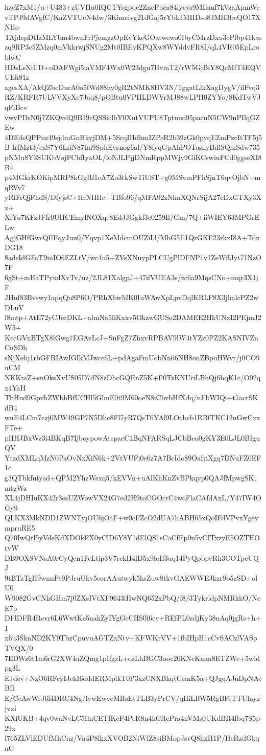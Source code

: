 hzeZ7xM1/u+U483+zUVHu0IQCTYsgpqe2ZncPuca84lycvs9MIlanf7kVzaApmWe
vTPJ9dAVgfC/KaZVTUcN4dw/3Kimcivg21dGaj5rYbkJMHDso8JMH3beQO17XNHo
TAjdcpDtIzMLYbm4bwnFrPjemgzOpEvYkeGOatwewo0IbyCMrzDxu3cPfbp41kas
zq9RP3c5ZMzq0mVkkrwjSNUg2Mt0IBEvKPQXw8WYddvFR8I/qL4VR05EpLroblwC
HDsLsNiUD+oDAFWgi5iaVMF4Wx0W23dgu7HvmT2/rW5GjBiY8QcMfT4EQVUEh81z
agesXA/AkQZbeDurA0o5fWd88hy0gR2tNMK8HV3N/TggatLlkXaglJygV/ilFvq3
RZ/KRFR7ULVVXyXe7Jaq8/pOBtu0VPIILDWVrMJ88wLPH0ZYYo/8KdTwVJqFfBev
vwvPDsN0j7ZKQvdQ9B19cQSSiclbY0XutVUPU8Tptuuo95pacnN5CW9uPIlqGZEw
4DEdeQPPnz49sjdmGnHkyjDM+5ScqIHdhmIZPeR2b39zGk0pyqEZmPzcItTF5j5B
IrfMzt3/eaS7Y6LriN87lm9SphEysnog6al/Y8fyqGpAhPOTosnyBdlSQmSdw735
pNMu8Y3SUKbVojFCbfIyxOL/loNJLPjjDNmRppMWjy9GiKCswiuFCd0ggseXI8B4
p4MGkrKOKipMRP8kGgRf1cA7Zu3tkSwTiUST+g0MSvmPFhSjnT6qvOjbN+mqRVv7
yRfFrQjFhdS/DfyjsC+HrNHHc+TBfo96/qMFA92zNhnXQNrSijA27cDxGTXy3Xx+
XfYu7KFzJFfr0UHCEmylNOXqe8EdJJGgkf3c0259Il/Gm/7Q+iiWIEY63MPGrELw
AgjGHfGwcQEFqyJuu0/Yqvp1XeMdcmOUZiLl/MbG5E1QzGKF23rkxI8A+TdzDG18
8adsIdGFaT9mIO6EZLtV/wc4u5+ZVsXNuypPLCUgPlDFNP1v1ZeWffJyt71NzO7F
6gSt+mHaTPyxdXvTv/uz/2JL81XalgpJ+47ifVUEA3s/zc6a9MqsCNo+mqr3X1jF
JHnf83Bvswy1apqQu8P6O/PRhXbwMK0IuWAwXpLpvDqlKRLF8X3jhalcPZ2wDLuV
l8mtp+AtE72yCJerDKL+almNa5liKxxv5OkzwGUSo2DAMEE2HkUNxI2PEjmJ2W5+
KccGVnBTgX8lGwg7EGAvLcJ+SuFgZ7ZhxvRPBAV9lW4tYZz0PZ2KASNIVZnCnSDh
sNjXebj1rbGFRIAwIGIkMJwce6L+pdAgaFmUobNn66NH8onZBpuHWvr/j0CO9uCM
NKKmZ+snOksXvUS05D7dN8zDhcGQEnZ5K+F0TzKNUriLBhQj6bqK1c/O92qx4YaH
TbHud9GpvhZWbhBfUCHl5GlmE0t9M60oeN8iCbvbHfXdq/nFbWIQi+t7acrSKdB4
wuE4LCm7czj0MW49GP7N5Dhc8Fl7yR7QsT6YAl9LOcbeb1RBfTKC12nGwCxxFTe+
pHHJBxWz3i4BKqB7IjboypowAtspaeC1BqNFARSqLJCbBco0gKY3E0LJL0BIguQV
YtzdXMLqMzN0PaOvNxXiN6k+2VtVUFi0e6z7A7BcIdo89OafjtXgq7DNuFZ0EF1c
g3QTbkfutyad+QPM2YhzWsxq5/kEVVn+uAlKhKnZvBPkqyp0QAJfMpwgSKimtgWz
XL4jDHIuKX42r3csUZWowVX24G7ed2H9toCGOcrC4woFlaCAfdAxL/Y47IW4OGy9
QLKX3MkNDD1ZWNTyjOU6jOaF+w0cFZcO2dUA7hABH65xQoIFdVPvxYgeympruRE5
Q70IwQrl5yVdeKdXDOkFX0yClD6Y8Y1dElQS1sCaCfEp9n5vCITxzyE5OZTHOrvW
DB9OXSVNsA0rCyQcn1FcLtip3V7rckH4lD5x9foIf3uq14PyQpbpvRh3COTpcUQJ
9tBTzTgH9wnnPt9PJruUkv5corAAutwyk5ksZuw8tkvGAEWWEJkzr9b5zSD+olU0
W9082GvCNhGHm7j0ZXsIVtXF9643iHwNQ652xPbQ/f8/3TykrldpNMRkkO/NcE7p
DFlDFR4Rcvr6L6WwtKe5nakZyIYgGeCHS0l6cy+REfPL0zdjKy38uAq0jgRs+h+1
x6u3SknND2KY9TbzCpuvuAGTZxNtv+KFWKrVV+1fbIHpH1cCvSACzlVASpTVQX/0
7EDWz6t1m6rG2XW4aZQmg1pIfgzL+ozLhBGC3ooc20KNcKnan8ETZWc+5widpg3L
EJdev+NzO6RFcyIJekI6oddERMpikT0P3xzCNXBkqtCemK5a+QJgqAJuDpNAeBIl
E/CeAwWrJ6f4DRC4Ng/lywEwveMRsEtTLB3yPrCV/qHiLRW5RgBFeTTUlnyzjvxi
KXiUKB+4qv0waNvLC5IlnCETfKcF4PeR8n4hCRePra4nVMs0UKdBR4fbq7S5p29x
l765ZLVlEDUfMhCnz/Vn4P8lkxXVOB2NiWlZ8siBMopJsvQ8hxH1P/HcRzdGkqnG
